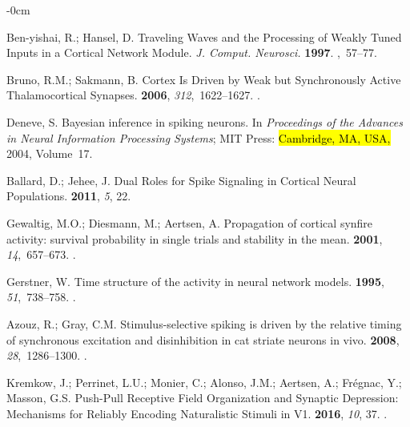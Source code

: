 \documentclass[brainsci, %
               review,accept,pdftex,moreauthors
               ]{Definitions/mdpi}
\begin{document}
\begin{adjustwidth}{-\extralength}{0cm}
\begin{thebibliography}{999}
Ben-yishai, R.; Hansel, D.
\newblock Traveling {Waves} and the {Processing} of {Weakly} {Tuned} {Inputs}
  in a {Cortical} {Network} {Module}.  \emph{J. Comput. Neurosci.} {\bf 1997}.
,~57--77.


Bruno, R.M.; Sakmann, B.
\newblock Cortex {Is} {Driven} by {Weak} but {Synchronously} {Active}
  {Thalamocortical} {Synapses}.
 {\bf 2006}, {\em 312},~1622--1627.
.

Deneve, S.
\newblock Bayesian inference in spiking neurons.
\newblock In \emph{Proceedings of the Advances in {Neural} {Information} {Processing}
  {Systems}}; MIT Press:  \hl{Cambridge, MA, USA,} %
  2004, Volume~17.

Ballard, D.; Jehee, J.
\newblock Dual {Roles} for {Spike} {Signaling} in {Cortical} {Neural}
  {Populations}.
 {\bf 2011}, {\em 5}, 22.

Gewaltig, M.O.; Diesmann, M.; Aertsen, A.
\newblock Propagation of cortical synfire activity: survival probability in
  single trials and stability in the mean.
 {\bf 2001}, {\em 14},~657--673.
.

Gerstner, W.
\newblock Time structure of the activity in neural network models.
 {\bf 1995}, {\em 51},~738--758.\linebreak
{}.

Azouz, R.; Gray, C.M.
\newblock Stimulus-selective spiking is driven by the relative timing of
  synchronous excitation and disinhibition in cat striate neurons {in
  vivo}.
 {\bf 2008}, {\em
  28},~1286--1300.
.

Kremkow, J.; Perrinet, L.U.; Monier, C.; Alonso, J.M.; Aertsen, A.; Frégnac,
  Y.; Masson, G.S.
\newblock Push-{Pull} {Receptive} {Field} {Organization} and {Synaptic}
  {Depression}: {Mechanisms} for {Reliably} {Encoding} {Naturalistic} {Stimuli}
  in {V1}.
 {\bf 2016}, {\em 10}, 37.
.


\end{thebibliography}
\end{adjustwidth}
\end{document}

